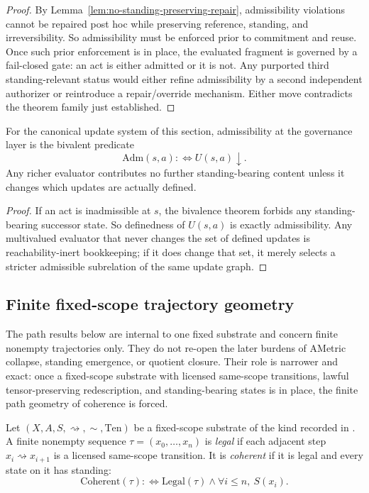 \begin{proof}
By Lemma~\ref{lem:no-standing-preserving-repair}, admissibility violations cannot be repaired post hoc while preserving reference, standing, and irreversibility. So admissibility must be enforced prior to commitment and reuse. Once such prior enforcement is in place, the evaluated fragment is governed by a fail-closed gate: an act is either admitted or it is not. Any purported third standing-relevant status would either refine admissibility by a second independent authorizer or reintroduce a repair/override mechanism. Either move contradicts the theorem family just established.\cite{MaleyAMetric}
\end{proof}

\begin{corollary}
\label{cor:binary-eligibility-state-transition}
For the canonical update system of this section, admissibility at the governance layer is the bivalent predicate
\[
\mathrm{Adm}(s,a) :\iff U(s,a)\downarrow.
\]
Any richer evaluator contributes no further standing-bearing content unless it changes which updates are actually defined.
\end{corollary}

\begin{proof}
If an act is inadmissible at $s$, the bivalence theorem forbids any standing-bearing successor state. So definedness of $U(s,a)$ is exactly admissibility. Any multivalued evaluator that never changes the set of defined updates is reachability-inert bookkeeping; if it does change that set, it merely selects a stricter admissible subrelation of the same update graph.\cite{MaleyAMetric}
\end{proof}

\subsection{Finite fixed-scope trajectory geometry}

The path results below are internal to one fixed substrate and concern finite nonempty trajectories only. They do not re-open the later burdens of AMetric collapse, standing emergence, or quotient closure. Their role is narrower and exact: once a fixed-scope substrate with licensed same-scope transitions, lawful tensor-preserving redescription, and standing-bearing states is in place, the finite path geometry of coherence is forced.\cite{MaleyTrajectory}

\begin{definition}
Let $(X,A,S,\rightsquigarrow,\sim,\mathrm{Ten})$ be a fixed-scope substrate of the kind recorded in \trajpaper. A finite nonempty sequence $\tau=(x_0,\dots,x_n)$ is \emph{legal} if each adjacent step $x_i\rightsquigarrow x_{i+1}$ is a licensed same-scope transition. It is \emph{coherent} if it is legal and every state on it has standing:
\[
\mathrm{Coherent}(\tau) :\iff \mathrm{Legal}(\tau) \wedge \forall i\le n,\ S(x_i).
\]
\end{definition}


